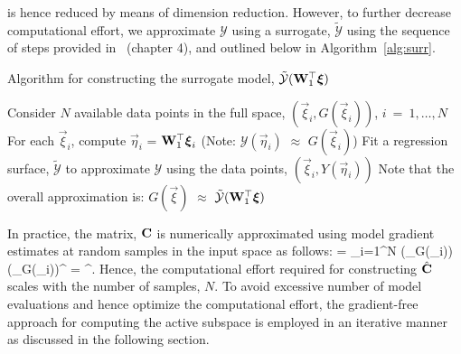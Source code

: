 is hence reduced by means of dimension reduction. However, to further decrease computational effort,
we approximate $\mathcal{Y}$ using a surrogate, $\tilde{\mathcal{Y}}$ using the sequence of steps
provided in~\cite{Constantine:2015} (chapter 4), and outlined below in Algorithm~\ref{alg:surr}.
\bigskip
\begin{breakablealgorithm}
\renewcommand{\algorithmicrequire}{\textbf{Input:}}
\renewcommand{\algorithmicensure}{\textbf{Output:}}
  \caption{Algorithm for constructing the surrogate model, $\tilde{\mathcal{Y}}(\mat{W}_1^\top\vec\xi)$}
  \begin{algorithmic}[1]
	  \State Consider $N$ available data points in the full space, $(\vec\xi_i,G(\vec\xi_i))$, $i~=~1,\ldots,N$
	  \State For each $\vec\xi_i$, compute $\vec\eta_i$ = $\mat{W}_1^\top\vec\xi_i$ 
          (Note: $\mathcal{Y}(\vec{\eta}_i)$ $\approx$ $G(\vec{\xi}_i)$)
	  \State Fit a regression surface, $\tilde{\mathcal{Y}}$ to approximate $\mathcal{Y}$ using the data
                 points, $(\vec\xi_i,Y(\vec\eta_i))$
	  \State Note that the overall approximation is: $G(\vec{\xi})$ $\approx$
                 $\tilde{\mathcal{Y}}(\mat{W}_1^\top\vec{\xi})$ 
	\EndProcedure
  \end{algorithmic}
  \label{alg:surr}
\end{breakablealgorithm}
\bigskip

In practice, the matrix, $\mathbf{{C}}$ is numerically approximated using model gradient estimates at random samples
in the input space as follows:
 \be
 \approx {} = \sum\limits_{i=1}^{N} 
 (\nabla_{\vec{\xi}}G(\vec{\xi}_i))(\nabla_{\vec{\xi}}G(\vec{\xi}_i))^\top
 = \hat{\mat{\Lambda}}^\top.
\label{eq:chat}
 \ee
Hence, the computational effort required for constructing $\hat{\mathbf{{C}}}$ scales with the number of samples, $N$.
To avoid excessive number of model evaluations and hence optimize the computational effort, the gradient-free
approach for computing the active subspace is employed in an iterative manner as discussed in the following section. 
